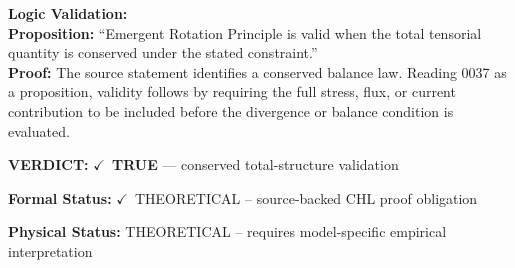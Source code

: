 \textbf{Logic Validation:}\\
\textbf{Proposition:} ``Emergent Rotation Principle is valid when the total tensorial quantity is conserved
under the stated constraint.''\\
\textbf{Proof:} The source statement identifies a conserved balance law. Reading 0037 as a proposition,
validity follows by requiring the full stress, flux, or current contribution to be
included before the divergence or balance condition is evaluated.

\textbf{VERDICT:} \ensuremath{\checkmark}\ \textbf{TRUE} --- conserved total-structure validation

\textbf{Formal Status:} \ensuremath{\checkmark}\ THEORETICAL -- source-backed CHL proof obligation

\textbf{Physical Status:} THEORETICAL -- requires model-specific empirical interpretation
\par\vspace{0.45em}
\par
\ifTZPDarkEdition
{}
\fi
\endgroup
\endgroup

